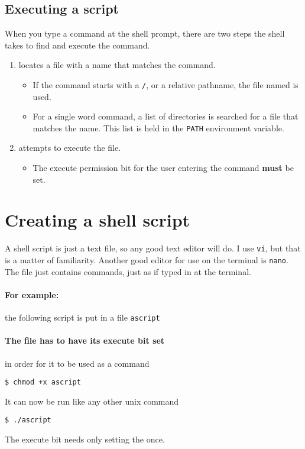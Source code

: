 \documentclass[12pt,a4paper]{article}
\begin{document}
\subsection{Executing a script}
When you type a command at the shell prompt, there are two steps the shell
takes to find and execute the command.
\begin{enumerate}
	\item locates a file with a name that matches the command.
		\begin{itemize}
			\item If the command starts with a \verb'/', or a relative
				pathname, the file named is used.
			\item For a single word command, a list of directories is searched
				for a file that matches the name.  This list is held in the
				\verb'PATH' environment variable.
		\end{itemize}
	\item attempts to execute the file.
		\begin{itemize}
			\item The execute permission bit for the user entering the command
				\textbf{must} be set.
		\end{itemize}
\end{enumerate}


\section{Creating a shell script}
A shell script is just a text file, so any good text editor will do.  I use
\verb'vi', but that is a matter of familiarity.  Another good editor for use
on the terminal is \verb'nano'.  The file just contains commands, just as if typed in at the terminal.


\paragraph{For example:} the following script is put in a file \texttt{ascript}
\begin{code}[title=ascript]
    
  \end{code}

\paragraph{The file has to have its execute bit set } in order for it
to be used as a command
\begin{terminal}
\begin{verbatim}
$ chmod +x ascript
\end{verbatim}
\end{terminal}
It can now be run like any other unix command
\begin{terminal}
\begin{verbatim}
$ ./ascript
\end{verbatim}
\end{terminal}
The execute bit needs only setting the once.
\end{document}
